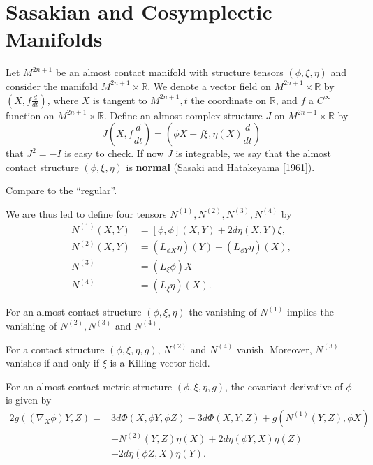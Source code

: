 \section{Sasakian and Cosymplectic Manifolds}

Let $M^{2 n+1}$ be an almost contact manifold with structure tensors $(\phi, \xi, \eta)$ and consider the manifold $M^{2 n+1} \times \mathbb{R}$. We denote a vector field on $M^{2 n+1} \times \mathbb{R}$ by $(X, f \frac{d}{d t})$, where $X$ is tangent to $M^{2 n+1}, t$ the coordinate on $\mathbb{R}$, and $f$ a $C^{\infty}$ function on $M^{2 n+1} \times \mathbb{R}$. Define an almost complex structure $J$ on $M^{2 n+1} \times \mathbb{R}$ by
$$
J\left(X, f \frac{d}{d t}\right)=\left(\phi X-f \xi, \eta(X) \frac{d}{d t}\right)
$$
that $J^2=-I$ is easy to check. If now $J$ is integrable, we say that the almost contact structure $(\phi, \xi, \eta)$ is \textbf{normal} (Sasaki and Hatakeyama [1961]).

\begin{remark}
    Compare to the ``regular''.
\end{remark}

\begin{definition}
    We are thus led to define four tensors $N^{(1)}, N^{(2)}, N^{(3)}, N^{(4)}$ by
    \begin{equation}
        \begin{aligned}
N^{(1)}(X, Y) & =[\phi, \phi](X, Y)+2 d \eta(X, Y) \xi, \\
N^{(2)}(X, Y) & =\left(L_{\phi X} \eta\right)(Y)-\left(L_{\phi Y} \eta\right)(X), \\
N^{(3)} & =\left(L_{\xi} \phi\right) X \\
N^{(4)} & =\left(L_{\xi} \eta\right)(X) .
\end{aligned}
    \end{equation}
\end{definition}

\begin{theorem}
    For an almost contact structure $(\phi, \xi, \eta)$ the vanishing of $N^{(1)}$ implies the vanishing of $N^{(2)}, N^{(3)}$ and $N^{(4)}$.
\end{theorem}
\begin{theorem}
     For a contact structure $(\phi, \xi, \eta, g)$, $N^{(2)}$ and $N^{(4)}$ vanish. Moreover, $N^{(3)}$ vanishes if and only if $\xi$ is a Killing vector field.
\end{theorem}

\begin{lemma}
     For an almost contact metric structure $(\phi, \xi, \eta, g)$, the covariant derivative of $\phi$ is given by
     \begin{equation}
         \begin{aligned}
2 g\left(\left(\nabla_X \phi\right) Y, Z\right)= & 3 d \Phi(X, \phi Y, \phi Z)-3 d \Phi(X, Y, Z)+g\left(N^{(1)}(Y, Z), \phi X\right) \\
& +N^{(2)}(Y, Z) \eta(X)+2 d \eta(\phi Y, X) \eta(Z) \\
& -2 d \eta(\phi Z, X) \eta(Y).
\end{aligned}
     \end{equation}
\end{lemma}

